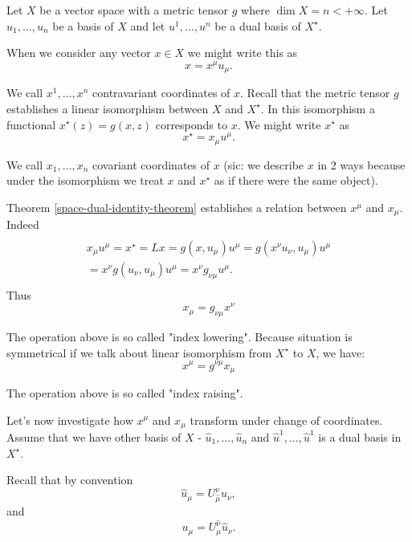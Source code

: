 \documentclass[main.tex]{subfiles}
\begin{document}
Let $X$ be a vector space with a metric tensor $g$ where $\dim X = n < +\infty$. Let $u_1, \dots, u_n$ be a basis of $X$ and let $u^1, \dots, u^n$ be a dual basis of $X^\star$.

When we consider any vector $x\in X$ we might write this as
\begin{equation}
x = x^\mu u_\mu.
\end{equation}

We call $x^1, \dots, x^n$ contravariant coordinates of $x$. Recall that the metric tensor $g$ establishes a linear isomorphism between $X$ and $X^\star$. In this isomorphism a functional $x^\star(z) = g(x, z)$ corresponds to $x$. We might write $x^\star$ as
\begin{equation}
x^\star = x_\mu u^\mu.
\end{equation}

We call $x_1, \dots, x_n$ covariant coordinates of $x$ (sic: we describe $x$ in 2 ways because under the isomorphism we treat $x$ and $x^\star$ as if there were the same object).

Theorem \ref{space-dual-identity-theorem} establishes a relation between $x^\mu$ and $x_\mu$. Indeed
\begin{multline*}
\\
x_\mu u^\mu = x^\star = Lx = 
g(x, u_\mu) u^\mu = 
g(x^\nu u_\nu, u_\mu)u^\mu 
\\= x^\nu g(u_\nu, u_\mu)u^\mu = x^\nu g_{\nu\mu} u^\mu.
\\
\end{multline*}
Thus
\begin{equation}
\boxed{
x_\mu = g_{\nu\mu} x^\nu}
\end{equation}

The operation above is so called "index lowering". Because situation is symmetrical if we talk about linear isomorphism from $X^\star$ to $X$, we have:
\begin{equation}
\boxed{
x^\mu = g^{\nu\mu} x_\mu}
\end{equation}

The operation above is so called "index raising". 


Let's now investigate how $x^\mu$ and $x_\mu$ transform under change of coordinates. Assume that we have other basis of $X$ - $\hat{u}_1, \dots, \hat{u}_n$ and $\hat{u}^1, \dots, \hat{u}^1$ is a dual basis in $X^\star$.

Recall that by convention 
\begin{equation}
\hat{u}_\mu = U^{\nu}_{\hat{\mu}} u_\nu,
\end{equation}
and
\begin{equation}
u_\mu =  U^{\hat{\nu}}_\mu  \hat{u}_\nu.
\end{equation}
\end{document}
